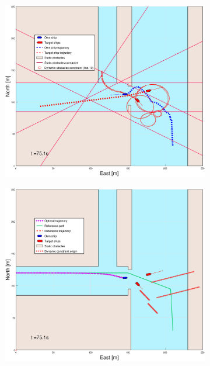 \begin{figure}[ht]
\begin{subfigure}[b]{0.499\textwidth}
    \end{subfigure}
    \hfill
    \\
    \begin{subfigure}[b]{0.49\textwidth}
        \centering
        \includegraphics[width=\textwidth]{Images/Figures/Havn1/_Simple_1fig1_time=75}
    \end{subfigure}
    \hfill
    \begin{subfigure}[b]{0.499\textwidth}
        \centering
        \includegraphics[width=\textwidth]{Images/Figures/Havn1/_Simple_1fig999_time=75}

\end{subfigure}
\end{figure}

